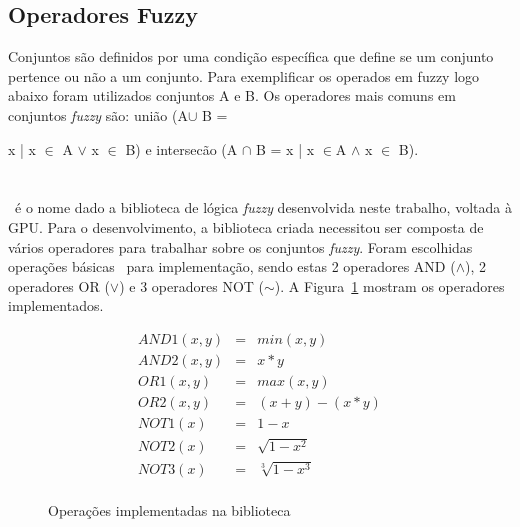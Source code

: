 \documentclass[12pt]{article}
\begin{document}
\subsection{Operadores Fuzzy}
Conjuntos são definidos por uma condição específica que define se um conjunto pertence ou não a um conjunto. Para exemplificar os operados em fuzzy logo abaixo foram utilizados conjuntos A e B.
Os operadores mais comuns em conjuntos \textit{fuzzy} são: união 
(A\begin{math} \cup \end{math} B ={ x | x \begin{math}\in \end{math} A \begin{math}\vee \end{math} x \begin{math}\in \end{math} B) e intersecão (A \begin{math} \cap \end{math} B = 
x | x \begin{math}\in \end{math}A \begin{math}\wedge \end{math} x \begin{math}\in \end{math} B).  




\section{\libname}
\label{sec:lib}

	\libname~é o nome dado a biblioteca de lógica \textit{fuzzy} desenvolvida neste trabalho, voltada à GPU. Para o desenvolvimento, a biblioteca criada necessitou ser composta de vários operadores para trabalhar sobre os conjuntos \textit{fuzzy}. Foram escolhidas operações básicas~\cite{klir:95} para implementação, sendo estas 2 operadores AND ($\wedge$), 2 operadores OR ($\vee$) e 3 operadores NOT ($\sim$). A Figura~\ref{fig:fuzzyops} mostram os operadores implementados.
	
\begin{figure}[!h]
\centering

\[ \begin{array}{ccc}
	AND1(x, y) & = & min(x, y) \\
	AND2(x, y) & = & x * y \\
	OR1(x, y) & = & max(x, y) \\
	OR2(x, y) & = & (x + y) - (x * y)\\
	NOT1(x) & = & 1 - x \\
	NOT2(x) & = & \sqrt{1-x^2} \\
	NOT3(x) & = & \sqrt[3]{1-x^3} \\
\end{array} \]
\caption{Operações implementadas na biblioteca~\libname}
\label{fig:fuzzyops}
\end{figure}

}
\end{document}
